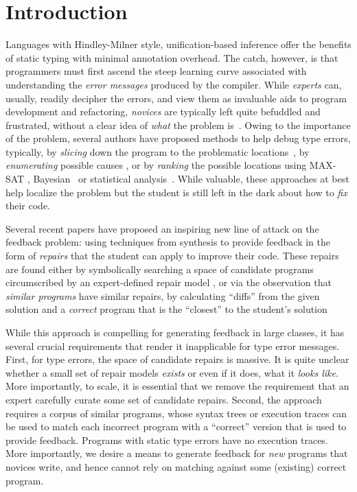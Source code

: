 \section{Introduction}
\label{sec:intro}

%
Languages with Hindley-Milner style, unification-based inference
offer the benefits of static typing with minimal annotation overhead.
The catch, however, is that programmers must first ascend the steep
learning curve associated with understanding the \emph{error messages}
produced by the compiler.
%
While \emph{experts} can, usually, readily decipher the errors, and
view them as invaluable aids to program development and refactoring,
\emph{novices} are typically left quite befuddled and frustrated,
without a clear idea of \emph{what} the problem is~\cite{Wand1986-nw}.
%
Owing to the importance of the problem, several authors
have proposed methods to help debug type errors, typically,
by \emph{slicing} down the program to the problematic locations~\cite{Haack2003-vc, Rahli2015-tt},
by \emph{enumerating} possible causes \cite{Lerner2007-dt, Chen2014-gd},
or by \emph{ranking} the possible locations using MAX-SAT
\cite{Pavlinovic2014-mr}, Bayesian~\cite{Zhang2014-lv}
or statistical analysis~\cite{Seidel:2017}.
%
While valuable, these approaches at best help localize
the problem but the student is still left in the dark
about how to \emph{fix} their code.

%
Several recent papers have proposed an inspiring new line of
attack on the feedback problem: using techniques from synthesis
to provide feedback in the form of \emph{repairs} that the student
can apply to improve their code.
%
These repairs are found either by symbolically searching a space
of candidate programs circumscribed by an expert-defined repair
model \cite{singh2013,HeadGSSFDH17}, or via the observation that
\emph{similar programs} have similar repairs, \ie by calculating
``diffs'' from the given solution and a \emph{correct} program
that is the ``closest'' to the student's solution ~\cite{Gulwani_2018,Wang_2018}

While this approach is compelling for generating feedback in large
classes, it has several crucial requirements that render it inapplicable
for type error messages.
%
First, for type errors, the space of candidate repairs is massive.
It is quite unclear whether a small set of repair models \emph{exists}
or even if it does, what it \emph{looks like}. More importantly,
to scale, it is essential that we remove the requirement that an
expert carefully curate some set of candidate repairs.
%
Second, the approach requires a corpus of similar programs,
whose syntax trees or execution traces can be used to match
each incorrect program with a ``correct'' version that is
used to provide feedback. Programs with static type errors
have no execution traces.
%
More importantly, we desire a means to generate feedback
for \emph{new} programs that novices write, and hence
cannot rely on matching against some (existing) correct
program.

